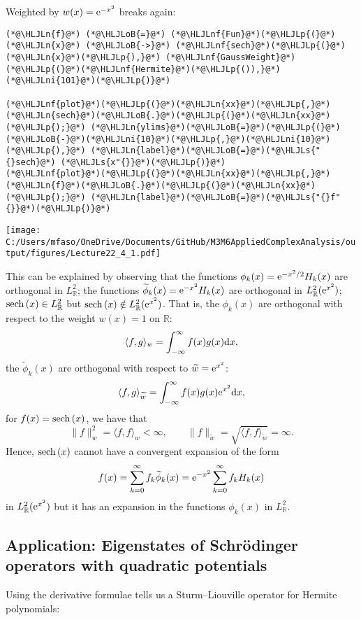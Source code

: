\documentclass[12pt,landscape]{article}
\newcommand{\HLJLn}[1]{#1}
\newcommand{\HLJLnf}[1]{\textcolor[RGB]{66,102,213}{#1}}
\newcommand{\HLJLs}[1]{\textcolor[RGB]{201,61,57}{#1}}
\newcommand{\HLJLni}[1]{\textcolor[RGB]{59,151,46}{#1}}
\newcommand{\HLJLoB}[1]{\textcolor[RGB]{102,102,102}{\textbf{#1}}}
\newcommand{\HLJLp}[1]{#1}
\def\D{ {\rm d} }
\def\E{ {\rm e} }
\def\sech{ {\rm sech}\, }
\def\endash{–}
\def\cent#1{\begin{center}#1\end{center} }
\begin{document}
{Weighted by $w(x) = \E^{-x^2}$ breaks again:


\begin{lstlisting}
(*@\HLJLn{f}@*) (*@\HLJLoB{=}@*) (*@\HLJLnf{Fun}@*)(*@\HLJLp{(}@*)(*@\HLJLn{x}@*) (*@\HLJLoB{->}@*) (*@\HLJLnf{sech}@*)(*@\HLJLp{(}@*)(*@\HLJLn{x}@*)(*@\HLJLp{),}@*) (*@\HLJLnf{GaussWeight}@*)(*@\HLJLp{(}@*)(*@\HLJLnf{Hermite}@*)(*@\HLJLp{()),}@*)(*@\HLJLni{101}@*)(*@\HLJLp{)}@*)

(*@\HLJLnf{plot}@*)(*@\HLJLp{(}@*)(*@\HLJLn{xx}@*)(*@\HLJLp{,}@*) (*@\HLJLn{sech}@*)(*@\HLJLoB{.}@*)(*@\HLJLp{(}@*)(*@\HLJLn{xx}@*)(*@\HLJLp{);}@*) (*@\HLJLn{ylims}@*)(*@\HLJLoB{=}@*)(*@\HLJLp{(}@*)(*@\HLJLoB{-}@*)(*@\HLJLni{10}@*)(*@\HLJLp{,}@*)(*@\HLJLni{10}@*)(*@\HLJLp{),}@*) (*@\HLJLn{label}@*)(*@\HLJLoB{=}@*)(*@\HLJLs{"{}sech}@*) (*@\HLJLs{x"{}}@*)(*@\HLJLp{)}@*)
(*@\HLJLnf{plot}@*)(*@\HLJLp{(}@*)(*@\HLJLn{xx}@*)(*@\HLJLp{,}@*) (*@\HLJLn{f}@*)(*@\HLJLoB{.}@*)(*@\HLJLp{(}@*)(*@\HLJLn{xx}@*)(*@\HLJLp{);}@*) (*@\HLJLn{label}@*)(*@\HLJLoB{=}@*)(*@\HLJLs{"{}f"{}}@*)(*@\HLJLp{)}@*)
\end{lstlisting}

\cent{\texttt{[image: C:/Users/mfaso/OneDrive/Documents/GitHub/M3M6AppliedComplexAnalysis/output/figures/Lecture22\_4\_1.pdf]}}

This can be explained by observing that the functions
$\phi_k(x) = \E^{-x^2/2}H_k(x)$
 are orthogonal in $L^2_{\mathbb{R}}$; the functions
$\widetilde{\phi}_k(x) = \E^{-x^2}H_k(x)$
are orthogonal in $L^2_{\mathbb{R}}(\E^{x^2})$; $\sech(x) \in L^2_{\mathbb{R}}$ but  $\sech(x) \notin L^2_{\mathbb{R}}(\E^{x^2})$. That is, the  $\phi_k(x)$ are orthogonal with respect to the weight $w(x) = 1$ on $\mathbb{R}$:
$$
\langle f, g \rangle_{w} = \int_{-\infty}^{\infty}f(x)g(x) \D x,
$$
the $\widetilde{\phi}_k(x)$ are orthogonal with respect to $\widetilde{w} = \E^{x^2}$:
$$
\langle f, g \rangle_{\widetilde{w}} = \int_{-\infty}^{\infty}f(x)g(x) \E^{x^2} \D x,
$$
for $f(x) = \sech(x)$, we have that
$$
\| f \|_{w}^2 = \langle f, f \rangle_{w} < \infty, \qquad \| f \|_{\widetilde{w}} = \sqrt{\langle f, f \rangle_{\widetilde{w}}} = \infty.
$$
Hence, $\sech(x)$ cannot have a convergent expansion of the form
$$
f(x) = \sum_{k = 0}^{\infty} f_k \widetilde{\phi}_k(x) = \E^{-x^2}  \sum_{k = 0}^{\infty} f_k H_k(x)
$$
in $L^2_{\mathbb{R}}(\E^{x^2})$ but it has an expansion in the functions $\phi_k(x)$ in $L^2_{\mathbb{R}}$.

\newpage

\subsection{Application:  Eigenstates of Schrödinger operators with quadratic potentials}
Using the derivative formulae tells us a Sturm\ensuremath{\endash}Liouville operator for Hermite polynomials:

}
\end{document}
